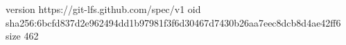 version https://git-lfs.github.com/spec/v1
oid sha256:6bcfd837d2e962494dd1b97981f3f6d30467d7430b26aa7eec8dcb8d4ae42ff6
size 462
